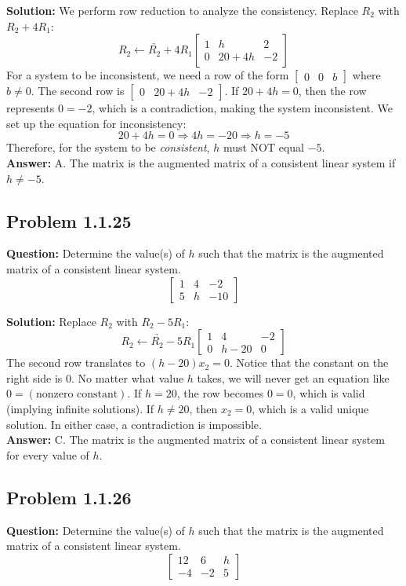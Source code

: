 \documentclass[11pt]{article}
\begin{document}
\textbf{Solution:}
We perform row reduction to analyze the consistency.
Replace $R_2$ with $R_2 + 4R_1$:
\[
\underrightarrow{R_2 \leftarrow R_2 + 4R_1}
\begin{bmatrix}
1 & h & 2 \\
0 & 20 + 4h & -2
\end{bmatrix}
\]
For a system to be inconsistent, we need a row of the form $\begin{bmatrix} 0 & 0 & b \end{bmatrix}$ where $b \neq 0$.
The second row is $\begin{bmatrix} 0 & 20+4h & -2 \end{bmatrix}$. 
If $20 + 4h = 0$, then the row represents $0 = -2$, which is a contradiction, making the system inconsistent.
We set up the equation for inconsistency:
\[ 20 + 4h = 0 \Rightarrow 4h = -20 \Rightarrow h = -5 \]
Therefore, for the system to be \textit{consistent}, $h$ must NOT equal $-5$.
\\
\textbf{Answer:} A. The matrix is the augmented matrix of a consistent linear system if $h \neq -5$.


\subsection*{Problem 1.1.25}
\textbf{Question:} Determine the value(s) of $h$ such that the matrix is the augmented matrix of a consistent linear system.
\[
\begin{bmatrix}
1 & 4 & -2 \\
5 & h & -10
\end{bmatrix}
\]

\textbf{Solution:}
Replace $R_2$ with $R_2 - 5R_1$:
\[
\underrightarrow{R_2 \leftarrow R_2 - 5R_1}
\begin{bmatrix}
1 & 4 & -2 \\
0 & h - 20 & 0
\end{bmatrix}
\]
The second row translates to $(h - 20)x_2 = 0$. 
Notice that the constant on the right side is $0$. No matter what value $h$ takes, we will never get an equation like $0 = (\text{nonzero constant})$. 
If $h = 20$, the row becomes $0 = 0$, which is valid (implying infinite solutions). 
If $h \neq 20$, then $x_2 = 0$, which is a valid unique solution.
In either case, a contradiction is impossible.
\\
\textbf{Answer:} C. The matrix is the augmented matrix of a consistent linear system for every value of $h$.


\subsection*{Problem 1.1.26}
\textbf{Question:} Determine the value(s) of $h$ such that the matrix is the augmented matrix of a consistent linear system.
\[
\begin{bmatrix}
12 & 6 & h \\
-4 & -2 & 5
\end{bmatrix}
\]
\end{document}
